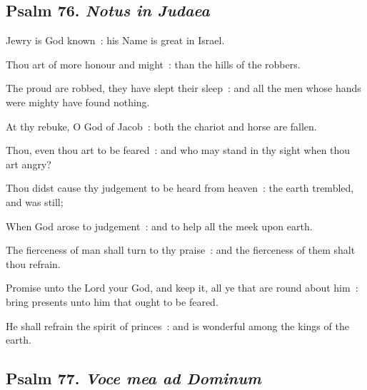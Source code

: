 \subsection{Psalm 76. \textit{Notus in Judaea}}

 Jewry is God known~: his Name is great in Israel.\par
{}
Thou art of more honour and might~: than the hills of the robbers.\par
{}The proud are robbed, they have slept their sleep~: and all the men whose hands were mighty have found nothing.\par
{}At thy rebuke, O God of Jacob~: both the chariot and horse are fallen.\par
{}Thou, even thou art to be feared~: and who may stand in thy sight when thou art angry?\par
{}Thou didst cause thy judgement to be heard from heaven~: the earth trembled, and was still;\par
{}When God arose to judgement~: and to help all the meek upon earth.\par
{}The fierceness of man shall turn to thy praise~: and the fierceness of them shalt thou refrain.\par
{}Promise unto the Lord your God, and keep it, all ye that are round about him~: bring presents unto him that ought to be feared.\par
{}He shall refrain the spirit of princes~: and is wonderful among the kings of the earth.\par

\subsection{Psalm 77. \textit{Voce mea ad Dominum}}

